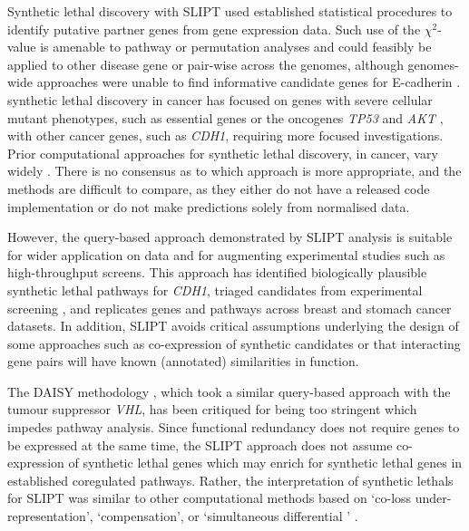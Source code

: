 Synthetic lethal discovery  with \gls{SLIPT} used established statistical procedures to identify putative partner genes from \gls{gene expression} data. Such use of the $\chi^2$-value is amenable to pathway or permutation analyses and could feasibly be applied to other disease gene or pair-wise across the \glspl{genome}, although \glspl{genome}-wide approaches were unable to find informative candidate genes for \gls{E-cadherin} \citep{Lu2015}. \Gls{synthetic lethal} discovery in cancer has focused on genes with severe cellular \gls{mutant} phenotypes, such as \gls{essential} genes or the \glspl{oncogene} \textit{TP53} and \textit{AKT} \citep{Tiong2014, Lu2015, Wang2013}, with other cancer genes, such as \textit{CDH1}, requiring more focused investigations. Prior computational approaches for \gls{synthetic lethal} discovery, in cancer, vary widely \citep{Tiong2014, Jerby2014, Lu2015, Wappett2016}. There is no consensus as to which approach is more appropriate, and the methods are difficult to compare, as they either do not have a released code implementation or do not make predictions solely from normalised  data.

However, the query-based approach demonstrated by \gls{SLIPT} analysis is suitable for wider application on  data and for augmenting experimental studies such as high-throughput screens. This approach has identified biologically plausible \gls{synthetic lethal} pathways for \textit{CDH1}, triaged candidates from experimental screening \citep{Telford2015}, and replicates genes and pathways across breast and stomach cancer datasets. In addition, \gls{SLIPT} avoids critical assumptions underlying the design of some approaches such as co-expression of synthetic candidates or that interacting gene pairs will have known (annotated) similarities in function.

The DAISY methodology \cite{Jerby2014}, which took a similar query-based approach with the \gls{tumour suppressor} \textit{VHL}, has been critiqued for being too stringent \citep{Lu2015} which impedes pathway analysis. Since \gls{functional redundancy} does not require genes to be expressed at the same time, the \gls{SLIPT} approach does not assume co-expression of \gls{synthetic lethal} genes which may enrich for \gls{synthetic lethal} genes in established coregulated pathways. Rather, the interpretation of \glspl{synthetic lethal} for \gls{SLIPT} was similar to other computational methods based on `co-loss under-represent\-at\-ion', `compensation', or `simultaneous differential ' \citep{Tiong2014, Lu2015, Wang2013}.

